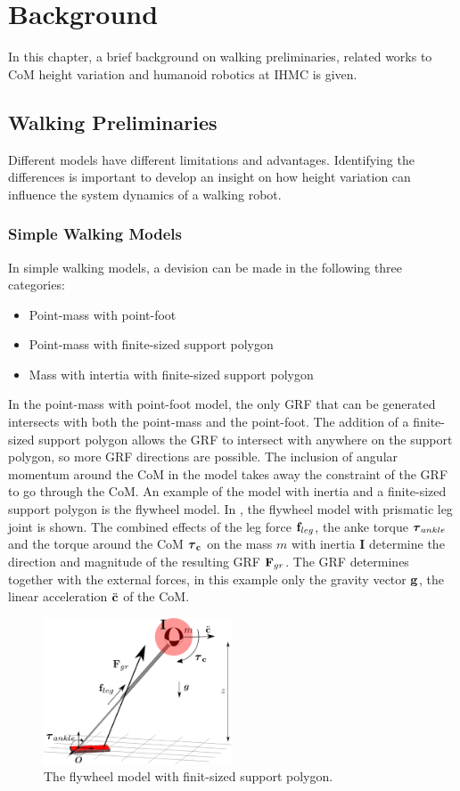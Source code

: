 %
\chapter{Background}\label{chap:background}
In this chapter, a brief background on walking preliminaries, related works to \ac{CoM} height variation and humanoid robotics at \ac{IHMC} is given.
\section{Walking Preliminaries}
Different models have different limitations and advantages. Identifying the differences is important to develop an insight on how height variation can influence the system dynamics of a walking robot.
\subsection{Simple Walking Models}
In simple walking models, a devision can be made in the following three categories:
\begin{itemize}
	\item Point-mass with point-foot
	\item Point-mass with finite-sized support polygon
	\item Mass with intertia with finite-sized support polygon
\end{itemize}
In the point-mass with point-foot model, the only \ac{GRF} that can be generated intersects with both the point-mass and the point-foot. The addition of a finite-sized support polygon allows the \ac{GRF} to intersect with anywhere on the support polygon, so more \ac{GRF} directions are possible. The inclusion of angular momentum around the \ac{CoM} in the model takes away the constraint of the \ac{GRF} to go through the \ac{CoM}. An example of the model with inertia and a finite-sized support polygon is the flywheel model. In , the flywheel model with prismatic leg joint is shown. The combined effects of the leg force $\mathbf{f}_{leg}$, the anke torque $\boldsymbol{\tau}_{ankle}$ and the torque around the \ac{CoM} $\boldsymbol{\tau}_{\mathbf{c}}$ on the mass $m$ with inertia $\mathbf{I}$ determine the direction and magnitude of the resulting \ac{GRF} $\mathbf{F}_{gr}$. The \ac{GRF} determines together with the external forces, in this example only the gravity vector $\mathbf{g}$, the linear acceleration $\ddot{\mathbf{c}}$ of the \ac{CoM}.
\begin{figure}[h]
\centering
\includegraphics[width=0.5\textwidth]{STYLESTUFF/FlywheelModel.png}
\caption{The flywheel model with finit-sized support polygon.}
\label{fig:flywheel}
\end{figure}


